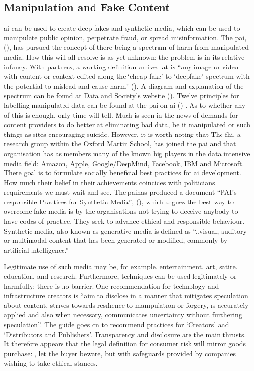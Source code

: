 \subsection{Manipulation and Fake Content}
\Gls{ai} can be used to create deep-fakes and synthetic media, which can be used to manipulate public opinion, perpetrate fraud, or spread misinformation. The \gls{pai}, (\cite{citation:partnershiponai}),  has pursued the concept of there being a spectrum of harm from manipulated media. How this will all resolve is as yet unknown; the problem is in its relative infancy. With partners, a working definition arrived at is ``any image or video with content or context edited along the `cheap fake' to `deepfake' spectrum with the potential to mislead and cause harm'' (\cite{citation:deepfakes}). A diagram and explanation of the spectrum can be found at Data and Society’s website (\cite{citation:deepfakesspectrum}). Twelve principles for labelling manipulated data can be found at the \gls{pai} on \gls{ai} (\cite{citation:twelveprinciples}) . As to whether any of this is enough, only time will tell. Much is seen in the news of demands for content providers to do better at eliminating bad data, be it manipulated or such things as sites encouraging suicide. However, it is worth noting that The \gls{fhi}, a research group within the Oxford Martin School, has joined the \gls{pai} and that organisation has as members many of the known big players in the data intensive media field: Amazon, Apple, Google/DeepMind, Facebook, IBM and Microsoft. There goal is to formulate socially beneficial best practices for \gls{ai} development. How much their belief in their achievements coincides with politicians requirements we must wait and see. The \gls{pai}has produced a document ``PAI’s responsible Practices for Synthetic Media'', (\cite{citation:pais}), which argues the best way to overcome fake media is by the organisations not trying to deceive anybody to have codes of practice. They seek to advance ethical and responsible behaviour. Synthetic media, also known as generative media is defined as ``..visual, auditory or multimodal content that has been generated or modified, commonly by artificial intelligence.''

Legitimate use of such media may be, for example, entertainment, art, satire, education, and research. Furthermore, techniques can be used legitimately or harmfully; there is no barrier. One recommendation for technology and infrastructure creators is ``aim to disclose in a manner that mitigates speculation about content, strives towards resilience to manipulation or forgery, is accurately applied and also when necessary, communicates uncertainty without furthering speculation''. The guide goes on to recommend practices for `Creators' and `Distributors and Publishers'. Transparency and disclosure are the main thrusts. It therefore appears that the legal definition for consumer risk will mirror goods purchase: , let the buyer beware, but with safeguards provided by companies wishing to take ethical stances.

